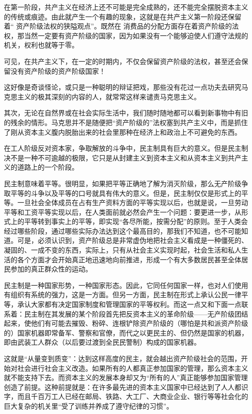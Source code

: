 在第一阶段，共产主义在经济上还{\kaishu 不}可能是完全成熟的，还不能完全摆脱资本主义的传统或痕迹。由此就产生一个有趣的现象，这就是在共产主义第一阶段还保留着“ {\kaishu 资产阶级}法权的狭隘观点”。既然在 {\kaishu 消费品}的分配方面存在着资产阶级的法权，那当然一定要有{\kaishu 资产阶级}的国家，因为如果没有一个能够{\kaishu 迫使}人们遵守法规的机关，权利也就等于零。

可见，在共产主义下，在一定的时期内，不仅会保留资产阶级的法权，甚至还会保留没有资产阶级的资产阶级国家！

这好像是奇谈怪论，或只是一种聪明的辩证把戏，那些没有花过一点功夫去研究马克思主义的极其深刻的内容的人，就常常这样来谴责马克思主义。

其次，无论在自然界或在社会实际生活中，我们随时随地都可以看到新事物中有旧的残余的情形。马克思并不是随便把“资产阶级的”法权塞到共产主义中，而是抓住了刚{\kaishu 从}资本主义{\kaishu 腹内}脱胎出来的社会里那种在经济上和政治上不可避免的东西。

在工人阶级反对资本家，争取解放的斗争中，民主制具有巨大的意义。但是民主制决不是一种不可逾越的极限，它只是从封建主义到资本主义和从资本主义到共产主义的道路上的一个阶段。

民主制意味着平等。很明显，如果把平等正确地了解为消灭{\kaishu 阶级}，那么无产阶级争取平等的斗争以及平等的口号就具有伟大的意义。但是，民主制仅仅是{\kaishu 形式上的}平等。一旦社会全体成员{\kaishu 在}占有生产资料{\kaishu 方面}的平等实现以后，也就是说，一旦劳动平等和工资平等实现以后，在人类面前就必然会产生一个问题：要更进一步，从形式上的平等转到事实上的平等，即实现“各尽所能，按需分配”的原则。至于人类会经过哪些阶段，通过哪些实际办法达到这个最高目的，那我们不知道，也不可能知道。可是，必须认识到，资产阶级总是非常虚伪地把社会主义看成是一种僵死的、凝固的、一成不变的东西，实际上，{\kaishu 只有}从社会主义实现时起，社会生活和私人生活的各个方面才会开始真正地迅速地向前推进，形成一个有{\kaishu 大多数}居民甚至全体居民参加的真正群众性的运动。

民主制是一种国家形势，一种国家形态。因此，它同任何国家一样，也对人们使用有组织有系统的强力，这是一方面。但另一方面，民主制在形式上承认公民一律平等，承认大家都有决定国家制度和管理国家的平等权利。而这一点又和下面一点联系着：民主制在其发展的某个阶段首先把反资本主义的革命阶级——无产阶级团结起来，使他们有可能去摧毁、粉碎、连根铲除资产阶级的（哪怕是共和派资产阶级的）国家机器即常备军、警察和官僚，而代之以{\kaishu 更}民主的、但仍然是国家的机器，即由武装工人群众（以后要过渡到全民民警制）构成的国家机器。

这就是“从量变到质变”：达到{\kaishu 这样}高度的民主，就会越出资产阶级社会的范围，开始对社会进行社会主义改造。如果{\kaishu 所有的人}都真正参加国家的管理，那么资本主义就不能支持下去。而资本主义的发展本身却又为“所有的人”真正{\kaishu 能够}参加国家管理创造了{\kaishu 前提}。这种前提就是：在许多最先进的资本主义国家中已经达到了人人都识字，而且千百万工人已经在邮局、铁路、大工厂、大商业企业、银行等等社会化的巨大复杂的机关里“受了训练并养成了遵守纪律的习惯”。

